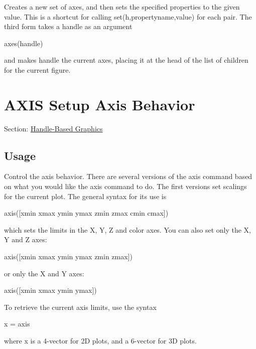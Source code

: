  Creates a new set of axes, and then sets the specified properties to the given value. This is a shortcut for calling {\ttfamily set(h,propertyname,value)} for each pair. The third form takes a handle as an argument \begin{DoxyVerb}  axes(handle)
\end{DoxyVerb}
 and makes {\ttfamily handle} the current axes, placing it at the head of the list of children for the current figure. \hypertarget{handle_axis}{}\section{A\-X\-I\-S Setup Axis Behavior}\label{handle_axis}
Section\-: \hyperlink{sec_handle}{Handle-\/\-Based Graphics} \hypertarget{vtkwidgets_vtkxyplotwidget_Usage}{}\subsection{Usage}\label{vtkwidgets_vtkxyplotwidget_Usage}
Control the axis behavior. There are several versions of the axis command based on what you would like the axis command to do. The first versions set scalings for the current plot. The general syntax for its use is \begin{DoxyVerb}  axis([xmin xmax ymin ymax zmin zmax cmin cmax])
\end{DoxyVerb}
 which sets the limits in the X, Y, Z and color axes. You can also set only the X, Y and Z axes\-: \begin{DoxyVerb}  axis([xmin xmax ymin ymax zmin zmax])
\end{DoxyVerb}
 or only the X and Y axes\-: \begin{DoxyVerb}  axis([xmin xmax ymin ymax])
\end{DoxyVerb}
 To retrieve the current axis limits, use the syntax \begin{DoxyVerb}  x = axis
\end{DoxyVerb}
 where {\ttfamily x} is a 4-\/vector for 2\-D plots, and a 6-\/vector for 3\-D plots.

